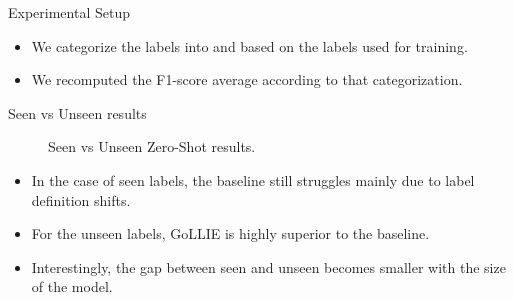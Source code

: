 \documentclass[
    11pt,
    notheorems,
    xcolor={dvipsnames},
    hyperref={
        pdfstartview=FitH, 
        pdftitle={Ikasketa-adibide urriko Informazio-Erauzketa}, 
        pdfauthor={Oscar Sainz Jimenez}, 
        citecolor=secondary, 
    }
]{beamer}
\begin{document}
\begin{frame}
    \begin{block}{Experimental Setup}
        \begin{itemize}
            \item We categorize the labels into  and  based on the labels used for training.
            \item We recomputed the F1-score average according to that categorization.
        \end{itemize}
    \end{block}
\end{frame}

\begin{frame}
    \begin{block}{Seen vs Unseen results}
        \begin{figure}
            \centering
            \resizebox{.6\textwidth}{!}{
                
            }
            \caption{Seen vs Unseen Zero-Shot results.}
        \end{figure}
        \vspace{-1em}
        \begin{itemize}
            \item In the case of seen labels, the baseline still struggles mainly due to label definition shifts.
            \item For the unseen labels, GoLLIE is highly superior to the baseline.
            \item Interestingly, the gap between seen and unseen becomes smaller with the size of the model.
        \end{itemize}
    \end{block}

\end{frame}


\end{document}
